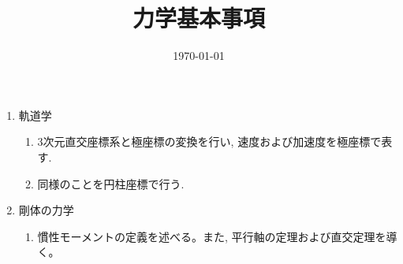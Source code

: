 \documentclass[11pt,a4paper]{jarticle}
\title{力学基本事項}
\author{}
\date{\today}
\begin{document}
\maketitle
\begin{enumerate}
    \item 軌道学
    \begin{enumerate}
        \item 3次元直交座標系と極座標の変換を行い, 速度および加速度を極座標で表す.
        \item 同様のことを円柱座標で行う.
    \end{enumerate}
    \item 剛体の力学
    \begin{enumerate}
        \item 慣性モーメントの定義を述べる。また, 平行軸の定理および直交定理を導く。
    \end{enumerate}
\end{enumerate}
\end{document}
